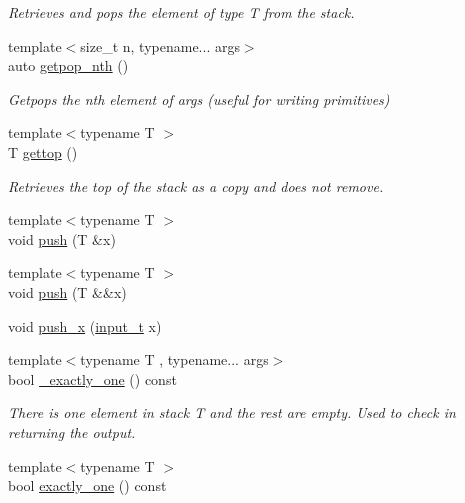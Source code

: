 \begin{DoxyCompactItemize}
\begin{DoxyCompactList}\small\item\em Retrieves and pops the element of type T from the stack. \end{DoxyCompactList}\item 
{\footnotesize template$<$size\+\_\+t n, typename... args$>$ }\\auto \hyperlink{class_virtual_machine_state_a5ec52045191cccdf0687dbca3f9b1921}{getpop\+\_\+nth} ()
\begin{DoxyCompactList}\small\item\em Getpops the n\textquotesingle{}th element of args (useful for writing primitives) \end{DoxyCompactList}\item 
{\footnotesize template$<$typename T $>$ }\\T \hyperlink{class_virtual_machine_state_ac5a22fb0fbfa599bcb5e6a5961598815}{gettop} ()
\begin{DoxyCompactList}\small\item\em Retrieves the top of the stack as a copy and does {\itshape not} remove. \end{DoxyCompactList}\item 
{\footnotesize template$<$typename T $>$ }\\void \hyperlink{class_virtual_machine_state_a7284f92013c7258d2d18ba238441c1a6}{push} (T \&x)
\item 
{\footnotesize template$<$typename T $>$ }\\void \hyperlink{class_virtual_machine_state_a1f7aab5a5bb3b9cc4d79b50f6191ed36}{push} (T \&\&x)
\item 
void \hyperlink{class_virtual_machine_state_a3d67a597eda47200e61434ff8048bc46}{push\+\_\+x} (\hyperlink{class_virtual_machine_state_aeb5e01ec57466fd3734e0c29f2b8da0a}{input\+\_\+t} x)
\item 
{\footnotesize template$<$typename T , typename... args$>$ }\\bool \hyperlink{class_virtual_machine_state_a301aafa7a503b733f221d7850d1a8886}{\+\_\+exactly\+\_\+one} () const
\begin{DoxyCompactList}\small\item\em There is one element in stack T and the rest are empty. Used to check in returning the output. \end{DoxyCompactList}\item 
{\footnotesize template$<$typename T $>$ }\\bool \hyperlink{class_virtual_machine_state_acbb3a56764c79f6952ffed7a13397cd1}{exactly\+\_\+one} () const

\end{DoxyCompactItemize}

